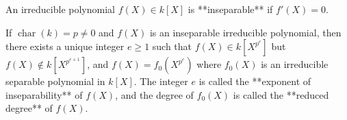 An irreducible polynomial $f(X) \in k[X]$ is **inseparable** if $f'(X) = 0$.

If $\operatorname{char}(k) = p \neq 0$ and $f(X)$ is an inseparable irreducible polynomial, then there exists a unique integer $e \geq 1$ such that $f(X) \in k[X^{p^e}]$ but $f(X) \notin k[X^{p^{e+1}}]$, and $f(X) = f_0(X^{p^e})$ where $f_0(X)$ is an irreducible separable polynomial in $k[X]$. The integer $e$ is called the **exponent of inseparability** of $f(X)$, and the degree of $f_0(X)$ is called the **reduced degree** of $f(X)$.
